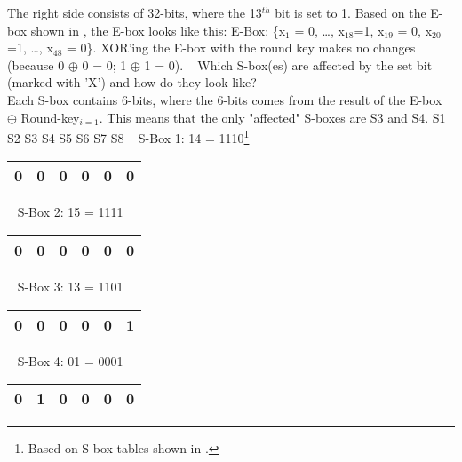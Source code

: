 \noindent
The right side consists of 32-bits, where the 13$^{th}$ bit is set to 1.
Based on the E-box shown in \cite[p.~63]{Paar2010}, the E-box looks like this:
E-Box: \{x$_{1}$ = 0, \ldots, x$_{18}$=1, x$_{19}$ = 0, x$_{20}$=1, \ldots, x$_{48}$ = 0\}. 
XOR'ing the E-box with the round key makes no changes (because 0 $\oplus$ 0 = 0; 1 $\oplus$ 1 = 0).
~
\vspace{1em}\newline
\noindent
Which S-box(es) are affected by the set bit (marked with 'X') and how do they look like? \\
Each S-box contains 6-bits, where the 6-bits comes from the result of the E-box $\oplus$ Round-key$_{i=1}$. This means that the only "affected" S-boxes are S3 and S4. 
\vspace{1em}\newline
\noindent
S1
\framebox[15pt][0]{}\quad
S2
\framebox[15pt][0]{}\quad
S3
\quad
S4
\quad
S5
\framebox[15pt][0]{}\quad
S6
\framebox[15pt][0]{}\quad
S7
\framebox[15pt][0]{}\quad
S8
\framebox[15pt][0]{}\quad
~
\vspace{1em}\newline
\noindent
S-Box 1: 14 = 1110\footnote{Based on S-box tables shown in \cite[p.~64-65]{Paar2010}.} \\
\begin{tabular}{ | l | l | l | l | l | l | } \hline 
	0 & 0 & 0 & 0 & 0 &  0 \\ \hline
\end{tabular}
~
\vspace{1em}\newline
\noindent
S-Box 2: 15 = 1111 \\
\begin{tabular}{ | l | l | l | l | l | l | } \hline 
0 & 0 & 0 & 0 & 0 &  0 \\ \hline
\end{tabular}
~
\vspace{1em}\newline
\noindent
S-Box 3: 13 = 1101 \\
\begin{tabular}{ | l | l | l | l | l | l | } \hline 
	0 & 0 & 0 & 0 & 0 &  1 \\ \hline
\end{tabular}
~
\vspace{1em}\newline
\noindent
S-Box 4: 01 = 0001 \\
\begin{tabular}{ | l | l | l | l | l | l | } \hline 
	0 & 1 & 0 & 0 & 0 &  0 \\ \hline
\end{tabular}
